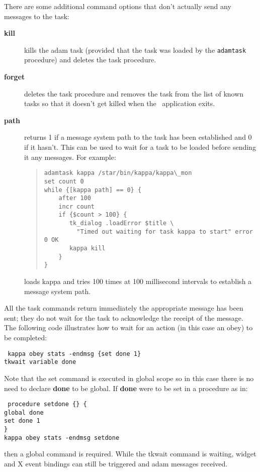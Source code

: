 There are some additional command options that don't actually send any messages
to the task:

\begin{description}
\item [{\bf kill}] kills the adam task (provided that the task was loaded
by the {\tt adamtask} procedure) and deletes the task procedure.
\item [{\bf forget}] deletes the task procedure and removes the task from
the list of known tasks so that it doesn't get killed when the \Tcl\ application
exits.
\item [{\bf path}]  returns 1
if a message system path to the task has been established and 0 if it hasn't.
This can be used to wait for a task to be loaded before sending it any
messages. For example:

\begin{quote}
\begin{verbatim}
adamtask kappa /star/bin/kappa/kappa\_mon
set count 0
while {[kappa path] == 0} {
    after 100
    incr count
    if {$count > 100} {
       tk_dialog .loadError $title \
         "Timed out waiting for task kappa to start" error 0 OK
       kappa kill
    }
}
\end{verbatim}
\end{quote}

loads kappa and tries 100 times at 100 millisecond intervals to establish
a message system path.
\end{description}

All the task commands return immediately the appropriate message has been
sent; they do not wait for the task to acknowledge the receipt of the
message. The following code illustrates how to wait for an action (in
this case an obey) to be completed:
\begin{tquote}{\tt
kappa obey stats -endmsg \{set done 1\}\\
tkwait variable done
}\end{tquote}
Note that the set command is executed in global scope so in this case there
is no need to declare {\bf done} to be global. If {\bf done} were to be
set in a procedure as in:
\begin{tquote}{\tt
procedure setdone \{\} \{\\
\hspace*{2em}global done\\
\hspace*{2em}set done 1\\
\}\\
kappa obey stats -endmsg setdone
}\end{tquote}
then a global command is required. While the tkwait command is waiting,
widget and X event bindings can still be triggered and adam messages
received.

